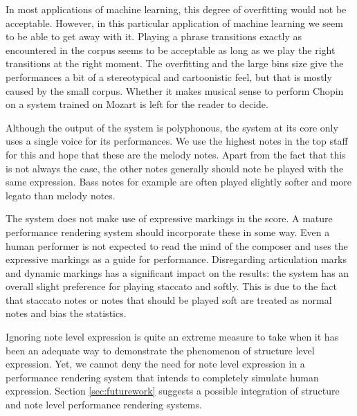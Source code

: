 \documentclass[a4paper,10pt]{article}
\begin{document}
In most applications of machine learning, this degree of overfitting would not be acceptable. However, in this particular application of machine learning we seem to be able to get away with it. Playing a phrase transitions exactly as encountered in the corpus seems to be acceptable as long as we play the right transitions at the right moment. The overfitting and the large bins size give the performances a bit of a stereotypical and cartoonistic feel, but that is mostly caused by the small corpus. Whether it makes musical sense to perform Chopin on a system trained on Mozart is left for the reader to decide. 

Although the output of the system is polyphonous, the system at its core only uses a single voice for its performances. We use the highest notes in the top staff for this and hope that these are the melody notes. Apart from the fact that this is not always the case, the other notes generally should note be played with the same expression. Bass notes for example are often played slightly softer and more legato than melody notes. 

The system does not make use of expressive markings in the score. A mature performance rendering system should incorporate these in some way. Even a human performer is not expected to read the mind of the composer and uses the expressive markings as a guide for performance. Disregarding articulation marks and dynamic markings has a significant impact on the results: the system has an overall slight preference for playing staccato and softly. This is due to the fact that staccato notes or notes that should be played soft are treated as normal notes and bias the statistics. 

Ignoring note level expression is quite an extreme measure to take when  it has been an adequate way to demonstrate the phenomenon of structure level expression. Yet, we cannot deny the need for note level expression in a performance rendering system that intends to completely simulate human expression. Section \ref{sec:futurework} suggests a possible integration of structure and note level performance rendering systems.






\end{document}
